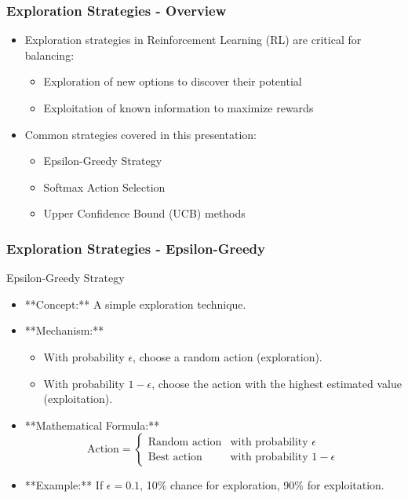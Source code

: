 \documentclass[aspectratio=169]{beamer}
\begin{document}
\begin{frame}[fragile]
    \frametitle{Exploration Strategies - Overview}
    \begin{itemize}
        \item Exploration strategies in Reinforcement Learning (RL) are critical for balancing:
        \begin{itemize}
            \item Exploration of new options to discover their potential
            \item Exploitation of known information to maximize rewards
        \end{itemize}
        \item Common strategies covered in this presentation:
        \begin{itemize}
            \item Epsilon-Greedy Strategy
            \item Softmax Action Selection
            \item Upper Confidence Bound (UCB) methods
        \end{itemize}
    \end{itemize}
\end{frame}

\begin{frame}[fragile]
    \frametitle{Exploration Strategies - Epsilon-Greedy}
    \begin{block}{Epsilon-Greedy Strategy}
        \begin{itemize}
            \item **Concept:** A simple exploration technique.
            \item **Mechanism:**
            \begin{itemize}
                \item With probability $\epsilon$, choose a random action (exploration).
                \item With probability $1 - \epsilon$, choose the action with the highest estimated value (exploitation).
            \end{itemize}
            \item **Mathematical Formula:**
            \begin{equation}
                \text{Action} = 
                \begin{cases} 
                \text{Random action} & \text{with probability } \epsilon \\
                \text{Best action} & \text{with probability } 1 - \epsilon 
                \end{cases}
            \end{equation}
            \item **Example:** If $\epsilon = 0.1$, 10\% chance for exploration, 90\% for exploitation.
        \end{itemize}
    \end{block}
\end{frame}
\end{document}
